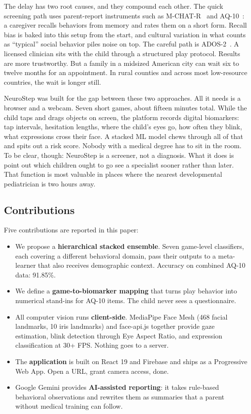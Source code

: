 \documentclass[conference]{IEEEtran}
\begin{document}
The delay has two root causes, and they compound each other. The quick screening path uses parent-report instruments such as M-CHAT-R~\cite{robins2014mchat} and AQ-10~\cite{allison2012aq10}: a caregiver recalls behaviors from memory and rates them on a short form. Recall bias is baked into this setup from the start, and cultural variation in what counts as ``typical'' social behavior piles noise on top. The careful path is ADOS-2~\cite{lord2012ados}. A licensed clinician sits with the child through a structured play protocol. Results are more trustworthy. But a family in a midsized American city can wait six to twelve months for an appointment. In rural counties and across most low-resource countries, the wait is longer still.

NeuroStep was built for the gap between these two approaches. All it needs is a browser and a webcam. Seven short games, about fifteen minutes total. While the child taps and drags objects on screen, the platform records digital biomarkers: tap intervals, hesitation lengths, where the child's eyes go, how often they blink, what expressions cross their face. A stacked ML model chews through all of that and spits out a risk score. Nobody with a medical degree has to sit in the room. To be clear, though: NeuroStep is a screener, not a diagnosis. What it does is point out which children ought to go see a specialist sooner rather than later. That function is most valuable in places where the nearest developmental pediatrician is two hours away.

\subsection{Contributions}
Five contributions are reported in this paper:
\begin{itemize}
    \item We propose a \textbf{hierarchical stacked ensemble}. Seven game-level classifiers, each covering a different behavioral domain, pass their outputs to a meta-learner that also receives demographic context. Accuracy on combined AQ-10 data: 91.85\%.
    \item We define a \textbf{game-to-biomarker mapping} that turns play behavior into numerical stand-ins for AQ-10 items. The child never sees a questionnaire.
    \item All computer vision runs \textbf{client-side}. MediaPipe Face Mesh (468 facial landmarks, 10 iris landmarks) and face-api.js together provide gaze estimation, blink detection through Eye Aspect Ratio, and expression classification at 30+ FPS. Nothing goes to a server.
    \item The \textbf{application} is built on React 19 and Firebase and ships as a Progressive Web App. Open a URL, grant camera access, done.
    \item Google Gemini provides \textbf{AI-assisted reporting}: it takes rule-based behavioral observations and rewrites them as summaries that a parent without medical training can follow.
\end{itemize}
\end{document}
